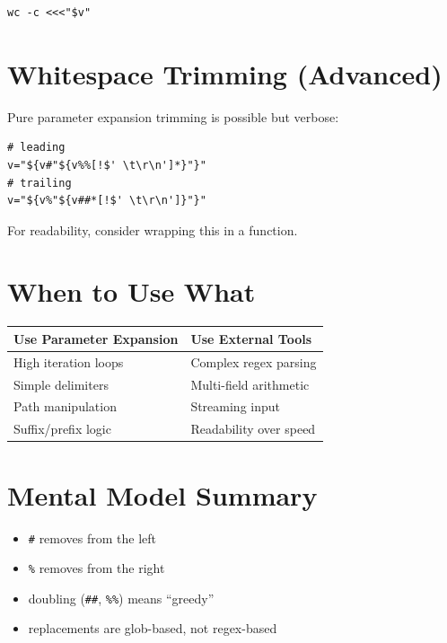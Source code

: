 \documentclass[11pt]{article}
\begin{document}
\begin{lstlisting}
wc -c <<<"$v"
\end{lstlisting}

\section{Whitespace Trimming (Advanced)}

Pure parameter expansion trimming is possible but verbose:

\begin{lstlisting}
# leading
v="${v#"${v%%[!$' \t\r\n']*}"}"
# trailing
v="${v%"${v##*[!$' \t\r\n']}"}"
\end{lstlisting}

For readability, consider wrapping this in a function.

\section{When to Use What}

\begin{longtable}{ll}
\toprule
Use Parameter Expansion & Use External Tools \\
\midrule
High iteration loops & Complex regex parsing \\
Simple delimiters & Multi-field arithmetic \\
Path manipulation & Streaming input \\
Suffix/prefix logic & Readability over speed \\
\bottomrule
\end{longtable}

\section{Mental Model Summary}

\begin{itemize}
\item \texttt{\#} removes from the left
\item \texttt{\%} removes from the right
\item doubling (\texttt{\#\#}, \texttt{\%\%}) means ``greedy''
\item replacements are glob-based, not regex-based
\end{itemize}
\end{document}
